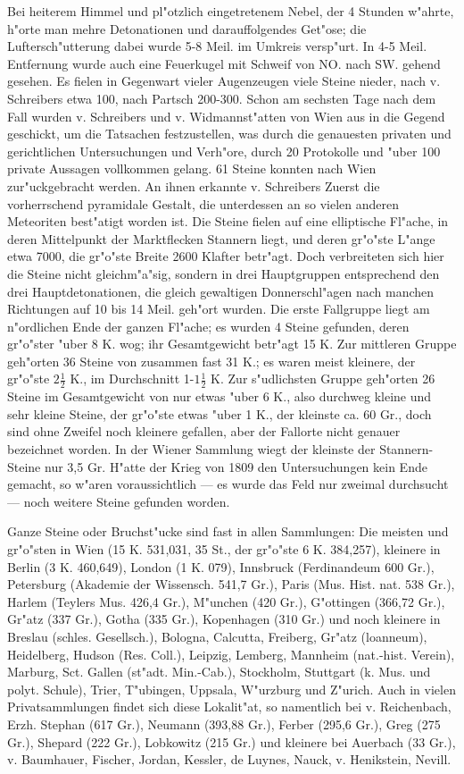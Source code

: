 \documentclass[a4paper, 11pt, oneside]{article}
\begin{document}
Bei heiterem Himmel und pl"otzlich eingetretenem Nebel, der 4 Stunden w"ahrte, h"orte man mehre Detonationen und darauffolgendes Get"ose; die Luftersch"utterung dabei wurde 5-8 Meil. im Umkreis versp"urt. In 4-5 Meil. Entfernung wurde auch eine Feuerkugel mit Schweif von NO. nach SW. gehend gesehen. Es fielen in Gegenwart vieler Augenzeugen viele Steine nieder, nach v. Schreibers etwa 100, nach Partsch 200-300. Schon am sechsten Tage nach dem Fall wurden v. Schreibers und v. Widmannst"atten von Wien aus in die Gegend geschickt, um die Tatsachen festzustellen, was durch die genauesten privaten und gerichtlichen Untersuchungen und Verh"ore, durch 20 Protokolle und "uber 100 private Aussagen vollkommen gelang. 61 Steine konnten nach Wien zur"uckgebracht werden. An ihnen erkannte v. Schreibers Zuerst die vorherrschend pyramidale Gestalt, die unterdessen an so vielen anderen Meteoriten best"atigt worden ist. Die Steine fielen auf eine elliptische Fl"ache, in deren Mittelpunkt der Marktflecken Stannern liegt, und deren gr"o"ste L"ange etwa 7000, die gr"o"ste Breite 2600 Klafter betr"agt. Doch verbreiteten sich hier die Steine nicht gleichm"a"sig, sondern in drei Hauptgruppen entsprechend den drei Hauptdetonationen, die gleich gewaltigen Donnerschl"agen nach manchen Richtungen auf 10 bis 14 Meil. geh"ort wurden. Die erste Fallgruppe liegt am n"ordlichen Ende der ganzen Fl"ache; es wurden 4 Steine gefunden, deren gr"o"ster "uber 8 K. wog; ihr Gesamtgewicht betr"agt 15 K. Zur mittleren Gruppe geh"orten 36 Steine von zusammen fast 31 K.; es waren meist kleinere, der gr"o"ste $\mathfrak{2\frac{1}{2}}$ K., im Durchschnitt 1-$\mathfrak{1\frac{1}{2}}$ K. Zur s"udlichsten Gruppe geh"orten 26 Steine im Gesamtgewicht von nur etwas "uber 6 K., also durchweg kleine und sehr kleine Steine, der gr"o"ste etwas "uber 1 K., der kleinste ca. 60 Gr., doch sind ohne Zweifel noch kleinere gefallen, aber der Fallorte nicht genauer bezeichnet worden. In der Wiener Sammlung wiegt der kleinste der Stannern-Steine nur 3,5 Gr. H"atte der Krieg von 1809 den Untersuchungen kein Ende gemacht, so w"aren voraussichtlich --- es wurde das Feld nur zweimal durchsucht --- noch weitere Steine gefunden worden.

Ganze Steine oder Bruchst"ucke sind fast in allen Sammlungen: Die meisten und gr"o"sten in Wien (15 K. 531,031, 35 St., der gr"o"ste 6 K. 384,257), kleinere in Berlin (3 K. 460,649), London (1 K. 079), Innsbruck (Ferdinandeum 600 Gr.), Petersburg (Akademie der Wissensch. 541,7 Gr.), Paris (Mus. Hist. nat. 538 Gr.), Harlem (Teylers Mus. 426,4 Gr.), M"unchen (420 Gr.), G"ottingen (366,72 Gr.), Gr"atz (337 Gr.), Gotha (335 Gr.), Kopenhagen (310 Gr.) und noch kleinere in Breslau (schles. Gesellsch.), Bologna, Calcutta, Freiberg, Gr"atz (loanneum), Heidelberg, Hudson (Res. Coll.), Leipzig, Lemberg, Mannheim (nat.-hist. Verein), Marburg, Sct. Gallen (st"adt. Min.-Cab.), Stockholm, Stuttgart (k. Mus. und polyt. Schule), Trier, T"ubingen, Uppsala, W"urzburg und Z"urich. Auch in vielen Privatsammlungen findet sich diese Lokalit"at, so namentlich bei v. Reichenbach, Erzh. Stephan (617 Gr.), Neumann (393,88 Gr.), Ferber (295,6 Gr.), Greg (275 Gr.), Shepard (222 Gr.), Lobkowitz (215 Gr.) und kleinere bei Auerbach (33 Gr.), v. Baumhauer, Fischer, Jordan, Kessler, de Luynes, Nauck, v. Henikstein, Nevill.
\end{document}
